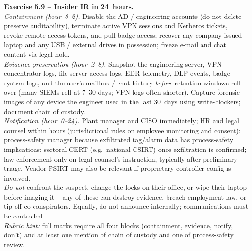 \documentclass[11pt,a4paper]{article}
\begin{document}
\begin{solutionbox}
\textbf{Exercise 5.9 -- Insider IR in 24~hours.}\\
\emph{Containment (hour~0--2).} Disable the AD / engineering accounts (do not delete --
preserve auditability), terminate active VPN sessions and Kerberos tickets, revoke
remote-access tokens, and pull badge access; recover any company-issued laptop and any
USB / external drives in possession; freeze e-mail and chat content via legal hold.\\
\emph{Evidence preservation (hour~2--8).} Snapshot the engineering server, VPN concentrator
logs, file-server access logs, EDR telemetry, DLP events, badge-system logs, and the user's
mailbox / chat history \emph{before} retention windows roll over (many SIEMs roll at 7--30
days; VPN logs often shorter). Capture forensic images of any device the engineer used in
the last 30~days using write-blockers; document chain of custody.\\
\emph{Notification (hour~0--24).} Plant manager and CISO immediately; HR and legal counsel
within hours (jurisdictional rules on employee monitoring and consent); process-safety
manager because exfiltrated tag/alarm data has process-safety implications; sectoral CERT
(e.g.\ national CSIRT) once exfiltration is confirmed; law enforcement only on legal
counsel's instruction, typically after preliminary triage. Vendor PSIRT may also be
relevant if proprietary controller config is involved.\\
\emph{Do not} confront the suspect, change the locks on their office, or wipe their laptop
before imaging it -- any of these can destroy evidence, breach employment law, or tip off
co-conspirators. Equally, do not announce internally; communications must be controlled.\\[2pt]
\emph{Rubric hint:} full marks require all four blocks (containment, evidence, notify, don't)
and at least one mention of chain of custody and one of process-safety review.
\end{solutionbox}
\end{document}
